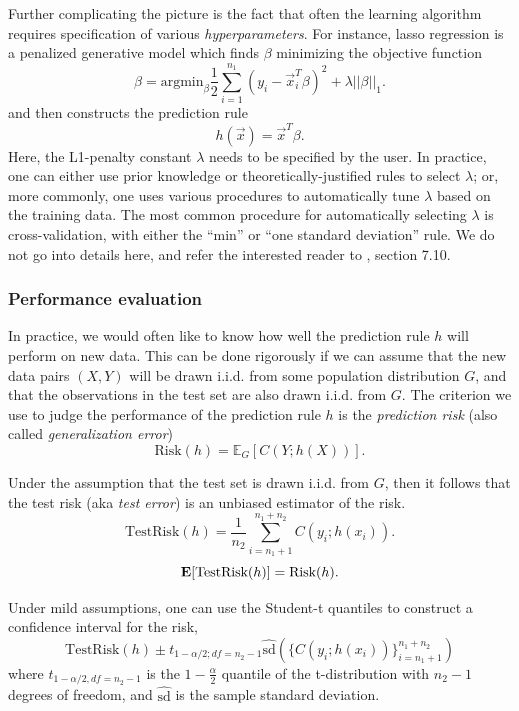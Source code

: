 Further complicating the picture is the fact that often the learning
algorithm requires specification of various \emph{hyperparameters}.
For instance, lasso regression is a penalized generative model which
finds $\beta$ minimizing the objective function
\[
\beta = \text{argmin}_\beta \frac{1}{2}\sum_{i=1}^{n_1}(y_i - \vec{x}_i^T \beta)^2 + \lambda ||\beta||_1.
\]
and then constructs the prediction rule
\[
h(\vec{x}) = \vec{x}^T \beta.
\]
Here, the L1-penalty constant $\lambda$ needs to be specified by the
user.  In practice, one can either use prior knowledge or
theoretically-justified rules to select $\lambda$; or, more commonly,
one uses various procedures to automatically tune $\lambda$ based on
the training data.  The most common procedure for automatically
selecting $\lambda$ is cross-validation, with either the ``min'' or
``one standard deviation'' rule.  We do not go into details here, and
refer the interested reader to \cite{Hastie2009a}, section 7.10.

\subsubsection{Performance evaluation}

In practice, we would often like to know how well the prediction rule
$h$ will perform on new data.  This can be done rigorously if we can
assume that the new data pairs $(X, Y)$ will be drawn i.i.d. from some
population distribution $G$, and that the observations in the test set
are also drawn i.i.d. from $G$.  The criterion we use to judge the
performance of the prediction rule $h$ is the \emph{prediction risk} (also called \emph{generalization error})
\[
\text{Risk}(h) = \mathbb{E}_G[C(Y; h(X))].
\]

Under the assumption that the test set is drawn i.i.d. from $G$, then
it follows that the test risk (aka \emph{test error}) is an unbiased
estimator of the risk.
\[
\text{TestRisk}(h) = \frac{1}{n_2} \sum_{i=n_1+1}^{n_1 + n_2} C(y_i; h(x_i)).
\]
\[
\textbf{E}[\text{TestRisk}(h)] = \text{Risk}(h).
\]

Under mild assumptions, one can use the Student-t quantiles to
construct a confidence interval for the risk,
\[
\text{TestRisk}(h) \pm t_{1 - \alpha/2; df = n_2 - 1} \hat{\text{sd}}(\{C(y_i; h(x_i))\}_{i=n_1+1}^{n_1 + n_2})
\]
where $t_{1 - \alpha/2, df = n_2 - 1}$ is the $1 - \frac{\alpha}{2}$
quantile of the t-distribution with $n_2 - 1$ degrees of freedom, and
$\hat{\text{sd}}$ is the sample standard deviation.

